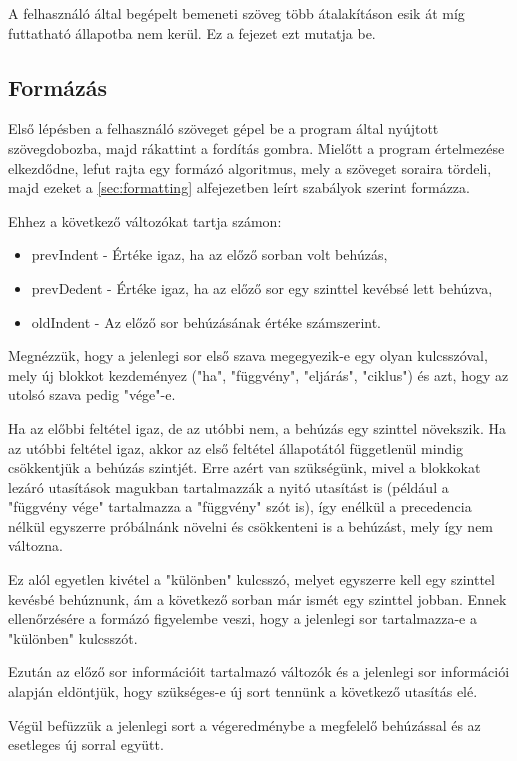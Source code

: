 A felhasználó által begépelt bemeneti szöveg több átalakításon esik át míg futtatható állapotba nem kerül. Ez a fejezet ezt mutatja be.

\subsection{Formázás}

Első lépésben a felhasználó szöveget gépel be a program által nyújtott szövegdobozba, majd rákattint a fordítás gombra. Mielőtt a program értelmezése elkezdődne, lefut rajta egy formázó algoritmus, mely a szöveget soraira tördeli, majd ezeket a \ref{sec:formatting} alfejezetben leírt szabályok szerint formázza.

Ehhez a következő változókat tartja számon:

\begin{itemize}
    \item prevIndent - Értéke igaz, ha az előző sorban volt behúzás,
    \item prevDedent - Értéke igaz, ha az előző sor egy szinttel kevébsé lett behúzva,
    \item oldIndent - Az előző sor behúzásának értéke számszerint.
\end{itemize}

Megnézzük, hogy a jelenlegi sor első szava megegyezik-e egy olyan kulcsszóval, mely új blokkot kezdeményez ("ha", "függvény", "eljárás", "ciklus") és azt, hogy az utolsó szava pedig "vége"-e.

Ha az előbbi feltétel igaz, de az utóbbi nem, a behúzás egy szinttel növekszik. Ha az utóbbi feltétel igaz, akkor az első feltétel állapotától függetlenül mindig csökkentjük a behúzás szintjét. Erre azért van szükségünk, mivel a blokkokat lezáró utasítások magukban tartalmazzák a nyitó utasítást is (például a "függvény vége" tartalmazza a "függvény" szót is), így enélkül a precedencia nélkül egyszerre próbálnánk növelni és csökkenteni is a behúzást, mely így nem változna.

Ez alól egyetlen kivétel a "különben" kulcsszó, melyet egyszerre kell egy szinttel kevésbé behúznunk, ám a következő sorban már ismét egy szinttel jobban. Ennek ellenőrzésére a formázó figyelembe veszi, hogy a jelenlegi sor tartalmazza-e a "különben" kulcsszót.

Ezután az előző sor információit tartalmazó változók és a jelenlegi sor információi alapján eldöntjük, hogy szükséges-e új sort tennünk a következő utasítás elé.

Végül befüzzük a jelenlegi sort a végeredménybe a megfelelő behúzással és az esetleges új sorral együtt.

